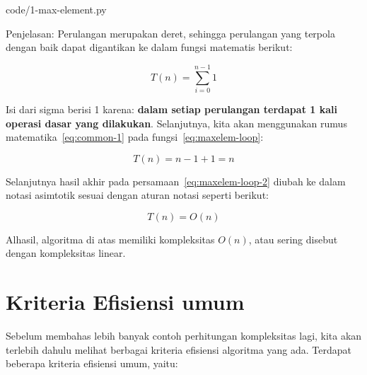 
                {code/1-max-element.py}

\FloatBarrier

Penjelasan: Perulangan merupakan deret, sehingga perulangan yang terpola dengan baik dapat digantikan ke dalam fungsi matematis berikut:

\begin{equation}\label{eq:maxelem-loop}
    T(n) = \sum\limits_{i=0}^{n-1} 1
\end{equation}

Isi dari sigma berisi 1 karena: \textbf{dalam setiap perulangan terdapat 1 kali operasi dasar yang dilakukan}. Selanjutnya, kita akan menggunakan rumus matematika~\ref{eq:common-1} pada fungsi~\ref{eq:maxelem-loop}:

\begin{equation}\label{eq:maxelem-loop-2}
T(n) = n - 1 + 1 = n
\end{equation}

Selanjutnya hasil akhir pada persamaan~\ref{eq:maxelem-loop-2} diubah ke dalam notasi asimtotik sesuai dengan aturan notasi seperti berikut:

$$
T(n) = O(n)
$$

Alhasil, algoritma di atas memiliki kompleksitas $O(n)$, atau sering disebut dengan kompleksitas linear.

\section{Kriteria Efisiensi umum}

Sebelum membahas lebih banyak contoh perhitungan kompleksitas lagi, kita akan terlebih dahulu melihat berbagai kriteria efisiensi algoritma yang ada. Terdapat beberapa kriteria efisiensi umum, yaitu:

